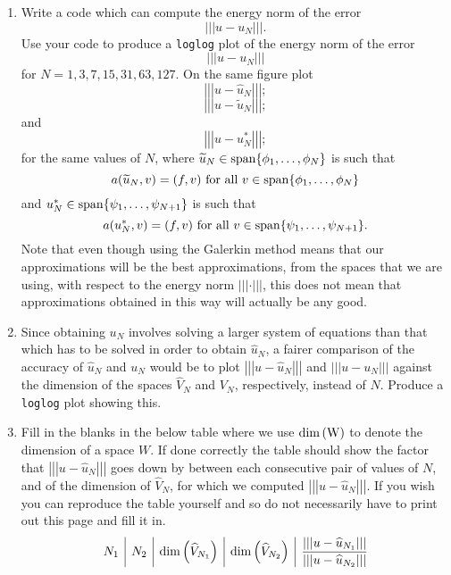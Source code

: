 \begin{enumerate}
\item Write a code which can compute the energy norm of the error 
\[
\left|\left|\left|u-u_N\right|\right|\right|.
\]
Use your code to produce a \verb|loglog| plot of the energy norm of the error
\[
\left|\left|\left|u-u_N\right|\right|\right|
\]
for $N=1,3,7,15,31,63,127$. On the same figure plot
\[
\left|\left|\left|u-\widehat{u}_N\right|\right|\right|;
\]
\[
\left|\left|\left|u-\widetilde{u}_N\right|\right|\right|;
\]
and
\[
\left|\left|\left|u-u_N^*\right|\right|\right|;
\]
for the same values of $N$, where $\widetilde{u}_N\in{\rm span}\{\phi_1,\ldots,\phi_N\}$ is such that
\[
a(\widetilde{u}_N,v)=(f,v)\mbox{ for all }v\in{\rm span}\{\phi_1,\ldots,\phi_N\}
\]
and $u_N^*\in{\rm span}\{\psi_1,\ldots,\psi_{N+1}\}$ is such that
\[
a(u_N^*,v)=(f,v)\mbox{ for all }v\in{\rm span}\{\psi_1,\ldots,\psi_{N+1}\}.
\]
Note that even though using the Galerkin method means that our approximations will be the best approximations, from the spaces that we are using, with respect to the energy norm $\left|\left|\left|\cdot\right|\right|\right|$, this does not mean that approximations obtained in this way will actually be any good.
\\
\item Since obtaining $u_N$ involves solving a larger system of equations than that which has to be solved in order to obtain $\widehat{u}_N$, a fairer comparison of the accuracy of $\widehat{u}_N$ and $u_N$ would be to plot $\left|\left|\left|u-\widehat{u}_N\right|\right|\right|$ and $\left|\left|\left|u-u_N\right|\right|\right|$ against the dimension of the spaces $\widehat{V}_N$ and $V_N$, respectively, instead of $N$. Produce a \verb|loglog| plot showing this.
\\
\item Fill in the blanks in the below table where we use $\rm{dim}\left(W\right)$ to denote the dimension of a space $W$. If done correctly the table should show the factor that $\left|\left|\left|u-\widehat{u}_N\right|\right|\right|$ goes down by between each consecutive pair of values of $N$, and of the dimension of $\widehat{V}_N$, for which we computed $\left|\left|\left|u-\widehat{u}_N\right|\right|\right|$. If you wish you can reproduce the table yourself and so do not necessarily have to print out this page and fill it in.
\[
\begin{array}{r|r|r|r|r}
N_1 & N_2 & {\rm dim}\left(\widehat{V}_{N_1}\right) & {\rm dim}\left(\widehat{V}_{N_2}\right) & \displaystyle{{\left|\left|\left|u-\widehat{u}_{N_1}\right|\right|\right| \over \left|\left|\left|u-\widehat{u}_{N_2}\right|\right|\right|}}

\end{array}\]
\end{enumerate}
